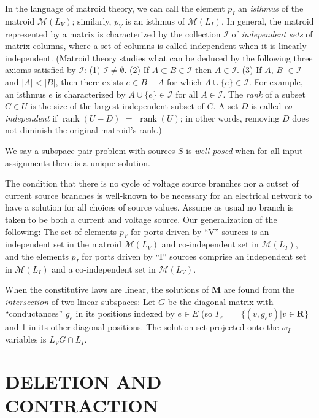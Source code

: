 \documentclass{article}
\def\Reals{\ensuremath{\mathbf R}}
\DeclareMathOperator{\rank}{rank}
\begin{document}
In the language of matroid theory, we can call the element $p_I$ an 
\textit{isthmus} of the matroid $\mathcal{M}(L_V)$; similarly, $p_V$ is
an isthmus of $\mathcal{M}(L_I)$.  In general, the matroid represented by
a matrix is characterized by the collection $\mathcal{I}$ 
of \textit{independent sets} 
of matrix columns, where a set of columns is called independent when it is
linearly independent.  (Matroid theory studies what can be deduced by 
the following three axioms satisfied by $\mathcal{I}$: (1) 
$\mathcal{I}\neq\emptyset$. 
(2) If $A\subset B\in\mathcal{I}$ then $A\in\mathcal{I}$.  (3) 
If $A$, $B$ $\in\mathcal{I}$ and $|A|<|B|$, then there exists $e\in B-A$ 
for which $A\cup\{e\}\in\mathcal{I}$.  For example, an isthmus $e$ is 
characterized by $A\cup\{e\}\in\mathcal{I}$ for all $A\in\mathcal{I}$.
The \textit{rank} of a subset $C\in U$ is the size of the largest independent
subset of $C$.  A set $D$ is called \textit{co-independent} if $\rank(U-D)$
$=$ $\rank(U)$; in other words, removing $D$ does not diminish the original
matroid's rank.)

We say a subspace pair problem with sources $S$ 
is \textit{well-posed} when for all input assignments there is a unique 
solution.


The condition that there is no cycle of voltage source branches nor a
cutset of current source branches is well-known to be necessary for 
an electrical network to have a solution for all choices of source values.
Assume as usual no branch is taken to be both a current and voltage source.
Our generalization of the following:
The set of elements $p_V$ 
for ports driven by ``V'' sources
is an independent set in the matroid $\mathcal{M}(L_V)$ and 
co-independent set
in $\mathcal{M}(L_I)$,
and the elements $p_I$ for ports driven by ``I'' sources comprise an
independent set in $\mathcal{M}(L_I)$ and a co-independent set in
$\mathcal{M}(L_V)$.  

When the constitutive laws are linear, the solutions of $\textbf{M}$ are
found from the \textit{intersection} of two linear subspaces:  Let $G$ 
be the diagonal matrix with ``conductances'' $g_e$ in its positions
indexed by $e \in E$ (so $\Gamma_e$ $=$ $\{ (v, g_e v) | v \in \Reals \}$
and 1 in its other diagonal positions.  The solution set projected onto
the $w_I$ variables is $L_VG\cap L_I$.

\section{DELETION AND CONTRACTION}
\end{document}
